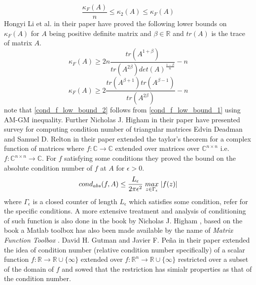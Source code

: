 \begin{equation} \label{cond_2_rel_cond_forb}
    \frac{\kappa_F(A)}{n} \le \kappa_2(A) \le \kappa_F(A)
\end{equation}
Hongyi Li et al. in their paper \cite{li2011note} have proved the following lower bounds on $\kappa_F(A)$ for $A$ being positive definite matrix and $\beta \in \mathbb{R}$ and $tr(A)$ is the trace of matrix $A$.
\begin{equation} \label{cond_f_low_bound_1}
    \kappa_F(A) \ge 2n\frac{tr(A^{1+\beta})}{tr(A^{2\beta})det(A)^{\frac{1-\beta}{n}}} -n
\end{equation}
\begin{equation} \label{cond_f_low_bound_2}
    \kappa_F(A) \ge 2\frac{tr(A^{\beta+1})tr(A^{\beta-1})}{tr(A^{2\beta})} -n
\end{equation}
note that \ref{cond_f_low_bound_2} follows from \ref{cond_f_low_bound_1} using AM-GM inequality. Further Nicholas J. Higham in their paper \cite{higham1987survey} have presented survey for computing condition number of triangular matrices
\newpage
{}
Edvin Deadman and Samuel D. Relton in their paper \cite{deadman2016taylor} extended the taylor's theorem for a complex function of matrices where $f:\mathbb{C}\to \mathbb{C}$ extended over matrices over $\mathbb{C}^{n\times n}$ i.e. $f:\mathbb{C}^{n\times n}\to \mathbb{C}$. For $f$ satisfying some conditions they proved the bound on the absolute condition number of $f$ at $A$ for $\epsilon>0$.
\begin{equation}
    cond_{abs}(f,A) \le \frac{L_{\epsilon}}{2\pi\epsilon^2}\hspace{1mm}\underset{z\in \Gamma_{\epsilon}}{max}\hspace{1mm} |f(z)|
\end{equation}
where $\Gamma_{\epsilon}$ is a closed counter of length $L_{\epsilon}$ which satisfies some condition, refer \cite{deadman2016taylor} for the specific conditions. A more extensive treatment and analysis of conditioning of such function is also done in the book by Nicholas J. Higham \cite{higham2008functions}, based on the book a Matlab toolbox has also been made available by the name of \textit{Matrix Function Toolbox} \cite{highammatlabtoolbox}.
\newline \newline David H. Gutman and Javier F. Peña in their paper \cite{gutman2021condition} extended the idea of condition number (relative condition number specifically) of a scalar function $f:\mathbb{R}\to \mathbb{R}\cup \{\infty\}$ extended over $f:\mathbb{R}^n\to \mathbb{R}\cup \{\infty\}$  restricted over a subset of the domain of $f$ and sowed that the restriction has simialr properties as that of the condition number.